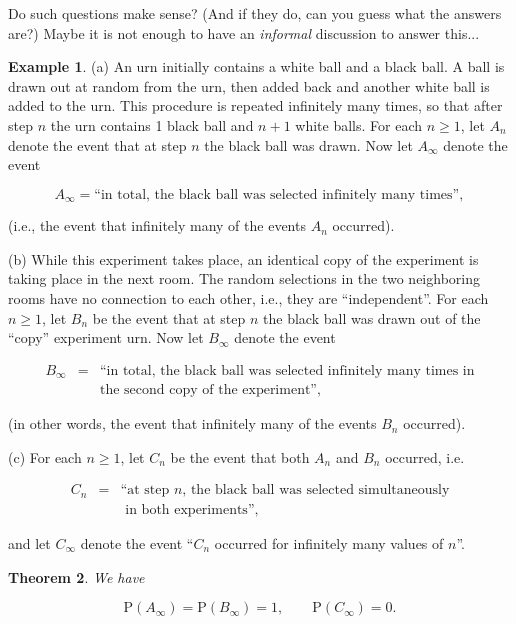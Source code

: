 \documentclass[11pt]{report}
\theoremstyle{plain}
\newtheorem{thm}{Theorem}[chapter]
\theoremstyle{definition}
\newtheorem{example}[thm]{Example}
\begin{document}
\noindent Do such questions make sense? (And if they do, can
you guess what the answers are?) Maybe it is not
enough to have an \emph{informal} discussion to answer
this...

\begin{example}
(a) An urn initially contains a white ball and a
black ball. A ball is drawn out at random from the
urn, then added back and another white ball is added
to the urn. This procedure is repeated infinitely many
times, so that after step $n$ the urn contains 1
black ball and $n+1$ white balls. For each $n\ge1$,
let $A_n$ denote the event that at step $n$ the black
ball was drawn. Now let $A_\infty$ denote the event

\[
A_\infty = \textrm{``in total, the black ball was selected infinitely many times''},
\]

\noindent (i.e., the event that infinitely many of the events
$A_n$ occurred).

(b) While this experiment takes place, an identical
copy of the experiment is taking place in the next
room. The random selections in the two neighboring
rooms have no connection to each other, i.e., they are
``independent''. For each $n\ge 1$, let $B_n$ be the
event that at step $n$ the black ball was drawn out
of the ``copy'' experiment urn. Now let $B_\infty$
denote the event

\begin{eqnarray*}
B_\infty &=& \textrm{``in total, the black ball was selected infinitely many times in}\\&&
\textrm{the second copy of the experiment''},
\end{eqnarray*}

\noindent (in other words, the event that infinitely many of
the events $B_n$ occurred).

(c) For each $n\ge 1$, let $C_n$ be the event that
both $A_n$ and $B_n$ occurred, i.e.

\begin{eqnarray*}
C_n &=& \textrm{``at step $n$, the black ball was selected simultaneously}
\\&& \textrm{ in both experiments'',}
\end{eqnarray*}

\noindent and let $C_\infty$ denote the event ``$C_n$ occurred
for infinitely many values of $n$''.
\end{example}

\begin{thm}
We have

\[
\mathrm{P}(A_\infty) = \mathrm{P}(B_\infty) = 1, \qquad \mathrm{P}(C_\infty) = 0.
\]

\end{thm}
\end{document}
